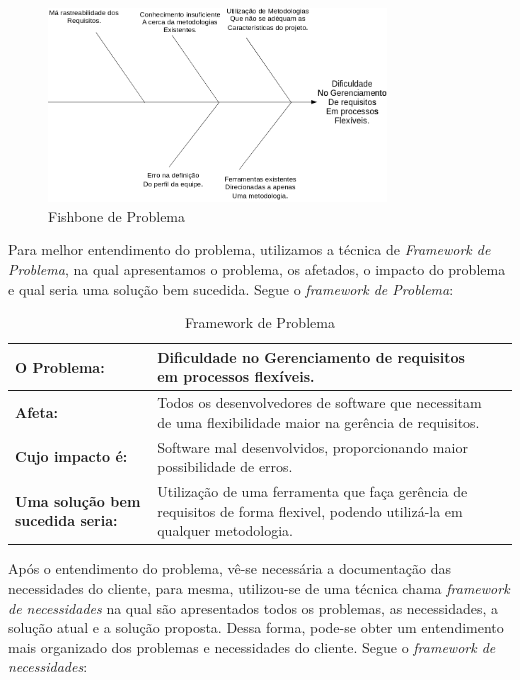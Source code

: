 \begin{figure}[!h]
	\centering
	\includegraphics[width=0.8\textwidth]{conteudo/fishbone}
	\caption{Fishbone de Problema}
\end{figure}

Para melhor entendimento do problema, utilizamos a técnica de \textit{Framework de Problema}, na qual apresentamos o problema, os afetados, o impacto do problema e qual seria uma solução bem sucedida. Segue o \textit{framework de Problema}:

\begin{table}[htbp]
\centering
\begin{tabular}{|p{2.5cm}|p{10cm}|p{2.5cm}|}
\hline
\textbf{O Problema:} & Dificuldade no Gerenciamento de requisitos em processos flexíveis. \\ \hline
\textbf{Afeta:} & Todos os desenvolvedores de software que necessitam de uma flexibilidade maior na gerência de requisitos. \\ \hline
\textbf{Cujo impacto é:} & Software mal desenvolvidos, proporcionando maior possibilidade de erros. \\ \hline
\textbf{Uma solução bem sucedida seria:} & Utilização de uma ferramenta que faça gerência de requisitos de forma flexivel, podendo utilizá-la em qualquer metodologia. \\ \hline
\end{tabular}
\label{}
\caption{Framework de Problema}
\end{table}

Após o entendimento do problema, vê-se necessária a documentação das necessidades do cliente, para mesma, utilizou-se de uma técnica chama \textit{framework de necessidades} na qual são apresentados todos os problemas, as necessidades, a solução atual e a solução proposta. Dessa forma, pode-se obter um entendimento mais organizado dos problemas e necessidades do cliente. Segue o \textit{framework de necessidades}:

